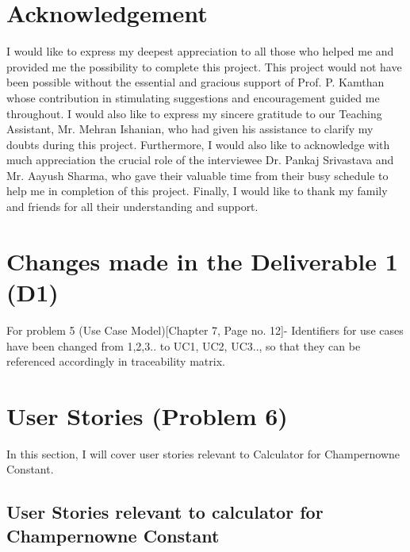 \documentclass[paper=a4, fontsize=11pt]{report}
\numberwithin{equation}{section}		%
\numberwithin{figure}{section}			%
\numberwithin{table}{section}				%
\begin{document}
\chapter{Acknowledgement}
I would like to express my deepest appreciation to all those who helped me and provided me the possibility to complete this project.
\vskip1mm
This project would not have been possible without the essential and gracious support of Prof. P. Kamthan whose contribution in stimulating suggestions and encouragement guided me throughout.
\vskip1mm
I would also like to express my sincere gratitude to our Teaching Assistant, Mr. Mehran Ishanian, who had given his assistance to clarify my doubts during this project.
\vskip1mm
Furthermore, I would also like to acknowledge with much appreciation the crucial role of the interviewee Dr. Pankaj Srivastava and Mr. Aayush Sharma, who gave their valuable time from their busy schedule to help me in completion of this project. 
\vskip1mm
Finally, I would like to thank my family and friends for all their understanding and support. 


\chapter{Changes made in the Deliverable 1 (D1)}
For problem 5 (Use Case Model)[Chapter 7, Page no. 12]- Identifiers for use cases have been changed from 1,2,3.. to UC1, UC2, UC3.., so that they can be referenced accordingly in traceability matrix.



\chapter{User Stories (Problem 6)}
In this section, I will cover user stories relevant to Calculator for Champernowne Constant. \newline

  
\section{User Stories relevant to calculator for Champernowne Constant }
\end{document}
